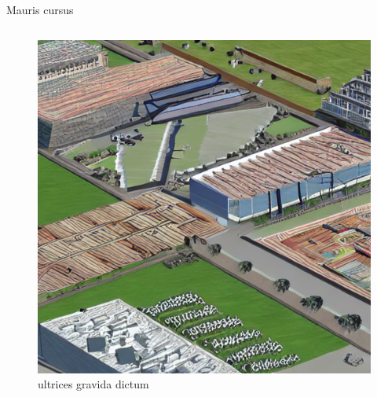 \begin{frame}{Mauris cursus}
\begin{columns}
\begin{figure}
        \includegraphics[width=0.95\linewidth]{images/image1.png}
        \caption{ultrices gravida dictum\cite{armstrong_my_2021}}
        \label{fig:ultrices_gravida_dictum}
    \end{figure}
    \end{columns}
\end{frame}



